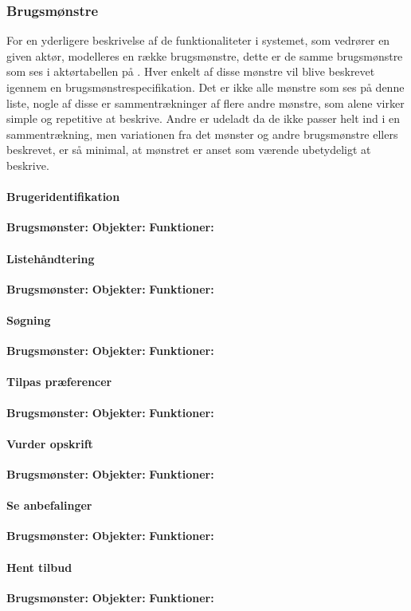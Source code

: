 \subsubsection*{Brugsmønstre}
For en yderligere beskrivelse af de funktionaliteter i systemet, som vedrører en given aktør, modelleres en række brugsmønstre, dette er de samme brugsmønstre som ses i aktørtabellen på . 
Hver enkelt af disse mønstre vil blive beskrevet igennem en brugsmønstrespecifikation. 
Det er ikke alle mønstre som ses på denne liste, nogle af disse er sammentrækninger af flere andre mønstre, som alene virker simple og repetitive at beskrive. 
Andre er udeladt da de ikke passer helt ind i en sammentrækning, men variationen fra det mønster og andre brugsmønstre ellers beskrevet, er så minimal, at mønstret er anset som værende ubetydeligt at beskrive.

\paragraph*{Brugeridentifikation}
\textbf{Brugsmønster:}
\textbf{Objekter:}
\textbf{Funktioner:}

\paragraph*{Listehåndtering}
\textbf{Brugsmønster:}
\textbf{Objekter:}
\textbf{Funktioner:}

\paragraph*{Søgning}
\textbf{Brugsmønster:}
\textbf{Objekter:}
\textbf{Funktioner:}

\paragraph*{Tilpas præferencer}
\textbf{Brugsmønster:}
\textbf{Objekter:}
\textbf{Funktioner:}

\paragraph*{Vurder opskrift}
\textbf{Brugsmønster:}
\textbf{Objekter:}
\textbf{Funktioner:}

\paragraph*{Se anbefalinger}
\textbf{Brugsmønster:}
\textbf{Objekter:}
\textbf{Funktioner:}

\paragraph*{Hent tilbud}
\textbf{Brugsmønster:}
\textbf{Objekter:}
\textbf{Funktioner:}